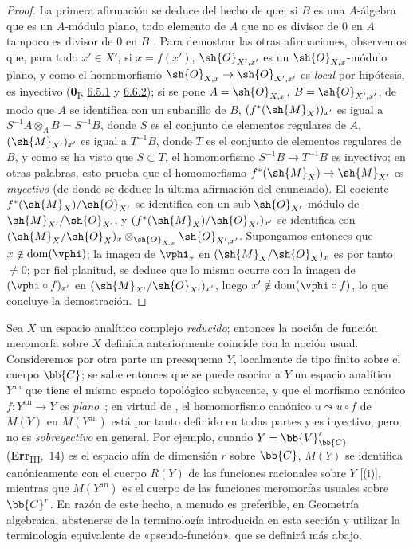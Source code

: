 \begin{proof}
La primera afirmación se deduce del hecho de que, si $B$ es una $A$-álgebra que es un $A$-módulo plano, todo elemento de $A$ que no es divisor de $0$ en $A$ tampoco es divisor de $0$ en $B$ .
Para demostrar las otras afirmaciones, observemos que, para todo $x'\in X'$, si $x=f(x')$, $\sh{O}_{X',x'}$ es un $\sh{O}_{X,x}$-módulo plano, y como el homomorfismo $\sh{O}_{X,x}\to\sh{O}_{X',x'}$ es \emph{local} por hipótesis, es inyectivo (\textbf{0}\textsubscript{I}, \hyperref[0.6.5.1]{6.5.1} y \hyperref[0.6.6.2]{6.6.2}); si se pone $A=\sh{O}_{X,x}$, $B=\sh{O}_{X',x'}$, de modo que $A$ se identifica con un subanillo de $B$, $(f^*(\sh{M}_X))_{x'}$ es igual a $S^{-1}A\otimes_A B=S^{-1}B$, donde $S$ es el conjunto de elementos regulares de $A$, $(\sh{M}_{X'})_{x'}$ es igual a $T^{-1}B$, donde $T$ es el conjunto
de elementos regulares de $B$, y como se ha visto que $S\subset T$, el homomorfismo $S^{-1}B\to T^{-1}B$ es inyectivo; en otras palabras, esto prueba que el homomorfismo  $f^*(\sh{M}_X)\to\sh{M}_{X'}$ es \emph{inyectivo} (de donde se deduce la última afirmación del enunciado).
El cociente $f^*(\sh{M}_X)/\sh{O}_{X'}$ se identifica con un sub-$\sh{O}_{X'}$-módulo de $\sh{M}_{X'}/\sh{O}_{X'}$, y $(f^*(\sh{M}_X)/\sh{O}_{X'})_{x'}$ se identifica con $(\sh{M}_X/\sh{O}_X)_x\otimes_{\sh{O}_{X,x}}\sh{O}_{X',x'}$.
Supongamos entonces que $x\notin\operatorname{dom}(\vphi)$; la imagen de $\vphi_x$ en $(\sh{M}_X/\sh{O}_X)_x$ es por tanto $\neq0$; por fiel planitud, se deduce que lo mismo ocurre con la imagen de $(\vphi\circ f)_{x'}$ en $(\sh{M}_{X'}/\sh{O}_{X'})_{x'}$, luego $x'\notin\operatorname{dom}(\vphi\circ f)$, lo que concluye la demostración.
\end{proof}

\begin{remark}[20.1.13]
\label{IV.20.1.13}
Sea $X$ un espacio analítico complejo \emph{reducido}; entonces la noción de función meromorfa sobre $X$ definida anteriormente coincide con la noción usual.
Consideremos por otra parte un preesquema $Y$, localmente de tipo finito sobre el cuerpo $\bb{C}$; se sabe entonces que se puede asociar a $Y$ un espacio analítico $Y^\mathrm{an}$ que tiene el mismo espacio topológico subyacente, y que el morfismo canónico $f:Y^\mathrm{an}\to Y$ es \emph{plano}~\cite{IV-37}; en virtud de , el homomorfismo canónico $u\leadsto u\circ f$ de $M(Y)$ en $M(Y^\mathrm{an})$ está por tanto definido en todas partes y es inyectivo; pero no es \emph{sobreyectivo} en general.
Por ejemplo, cuando $Y=\bb{V}_{\bb{C}}^r$ (\textbf{Err}\textsubscript{III},~14) es el espacio afín de dimensión $r$ sobre $\bb{C}$, $M(Y)$ se identifica canónicamente con el cuerpo $R(Y)$ de las funciones racionales sobre $Y$ [(i)], mientras que $M(Y^\mathrm{an})$ es el cuerpo de las funciones meromorfas usuales sobre $\bb{C}^r$.
En razón de este hecho, a menudo es preferible, en Geometría algebraica, abstenerse de la terminología introducida en esta sección y utilizar la terminología equivalente de «pseudo-función», que se definirá más abajo.
\end{remark}
